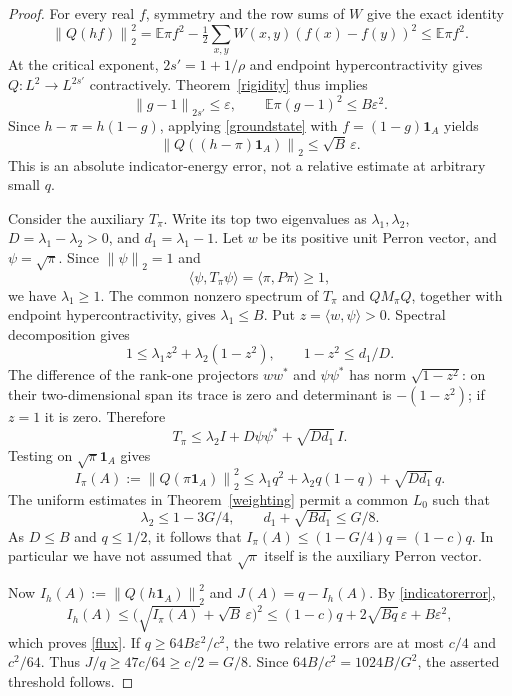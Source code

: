 \documentclass[11pt]{article}
\newcommand{\E}{\mathbb E}
\newcommand{\norm}[1]{\left\|#1\right\|}
\newcommand{\ip}[2]{\langle #1,#2\rangle}
\newcommand{\one}{\mathbf 1}
\begin{document}
\begin{proof}
For every real $f$, symmetry and the row sums of $W$ give the exact identity
\begin{equation}\label{groundstate}
 \norm{Q(hf)}_2^2
 =\E\pi f^2-\tfrac12\sum_{x,y}W(x,y)(f(x)-f(y))^2
 \leq\E\pi f^2.
\end{equation}
At the critical exponent, $2s'=1+1/\rho$ and endpoint hypercontractivity gives $Q:L^2\to L^{2s'}$ contractively. Theorem~\ref{rigidity} thus implies
\[
 \norm{g-1}_{2s'}\leq\varepsilon,\qquad
 \E\pi(g-1)^2\leq B\varepsilon^2.
\]
Since $h-\pi=h(1-g)$, applying \eqref{groundstate} with $f=(1-g)\one_A$ yields
\begin{equation}\label{indicatorerror}
 \norm{Q((h-\pi)\one_A)}_2\leq\sqrt B\,\varepsilon.
\end{equation}
This is an absolute indicator-energy error, not a relative estimate at arbitrary small $q$.

Consider the auxiliary $T_\pi$. Write its top two eigenvalues as $\lambda_1,\lambda_2$, $D=\lambda_1-\lambda_2>0$, and $d_1=\lambda_1-1$. Let $w$ be its positive unit Perron vector, and $\psi=\sqrt\pi$. Since $\norm\psi_2=1$ and
\[
 \ip\psi{T_\pi\psi}=\ip\pi{P\pi}\geq1,
\]
we have $\lambda_1\geq1$. The common nonzero spectrum of $T_\pi$ and $QM_\pi Q$, together with endpoint hypercontractivity, gives $\lambda_1\leq B$. Put $z=\ip w\psi>0$. Spectral decomposition gives
\[
 1\leq\lambda_1z^2+\lambda_2(1-z^2),\qquad
 1-z^2\leq d_1/D.
\]
The difference of the rank-one projectors $ww^*$ and $\psi\psi^*$ has norm $\sqrt{1-z^2}$: on their two-dimensional span its trace is zero and determinant is $-(1-z^2)$; if $z=1$ it is zero. Therefore
\[
 T_\pi\leq\lambda_2I+D\psi\psi^*+\sqrt{Dd_1}\,I.
\]
Testing on $\sqrt\pi\one_A$ gives
\[
 I_\pi(A):=\norm{Q(\pi\one_A)}_2^2
 \leq\lambda_1q^2+\lambda_2q(1-q)+\sqrt{Dd_1}\,q.
\]
The uniform estimates in Theorem~\ref{weighting} permit a common $L_0$ such that
\[
 \lambda_2\leq1-3G/4,\qquad d_1+\sqrt{Bd_1}\leq G/8.
\]
As $D\leq B$ and $q\leq1/2$, it follows that $I_\pi(A)\leq(1-G/4)q=(1-c)q$. In particular we have not assumed that $\sqrt\pi$ itself is the auxiliary Perron vector.

Now $I_h(A):=\norm{Q(h\one_A)}_2^2$ and $J(A)=q-I_h(A)$. By \eqref{indicatorerror},
\[
 I_h(A)\leq\bigl(\sqrt{I_\pi(A)}+\sqrt B\,\varepsilon\bigr)^2
 \leq(1-c)q+2\sqrt{Bq}\,\varepsilon+B\varepsilon^2,
\]
which proves \eqref{flux}. If $q\geq64B\varepsilon^2/c^2$, the two relative errors are at most $c/4$ and $c^2/64$. Thus $J/q\geq47c/64\geq c/2=G/8$. Since $64B/c^2=1024B/G^2$, the asserted threshold follows.


\end{proof}
\end{document}

